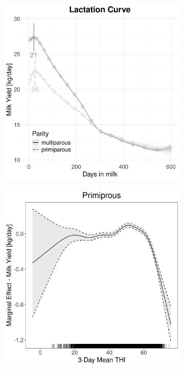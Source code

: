 \begin{figure}[H]
\begin{subfigure}[b]{0.45\textwidth}
        \includegraphics[width=\textwidth]{thesis/figures/models/milk/full/si_milk_full/si_milk_full_marginal_dim_milk_combined.png}
    \end{subfigure}
    \begin{subfigure}[b]{0.45\textwidth}
        \centering
        \includegraphics[width=\textwidth]{thesis/figures/models/milk/full/si_milk_full/si_milk_full_marginal_thi_milk_primi.png}

\end{subfigure}
\end{figure}
